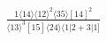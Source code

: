 \documentclass[varwidth, border=5pt]{standalone}
\begin{document}
\begin{my}
$\begin{gathered}
\scriptscriptstyle\frac{1⟨14⟩⟨12⟩^2⟨35⟩[14]^2}{⟨13⟩^3[15]⟨24⟩⟨1|2+3|1]}
\end{gathered}$
\end{my}
\end{document}
